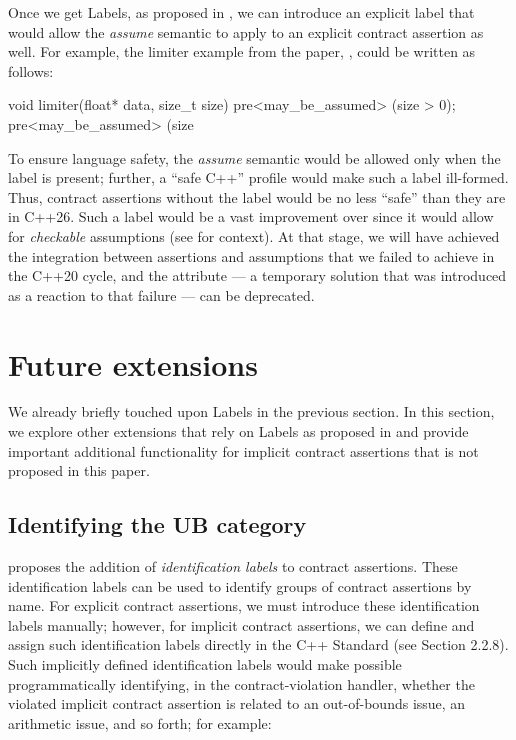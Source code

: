{Once we get Labels, as proposed in \cite{P3400R1}, we can introduce an explicit label that would allow the \emph{assume} semantic to apply to an explicit contract assertion as well. For example, the limiter example from the \tcode{[[assume]]} paper, \cite{P1774R8}, could be written as follows:
\begin{codeblock}
void limiter(float* data, size_t size)
  pre<may_be_assumed> (size > 0);
  pre<may_be_assumed> (size %
\end{codeblock}
To ensure language safety, the \emph{assume} semantic would be allowed only when the \mbox{} label is present; further, a ``safe C++'' profile would make such a label ill-formed. Thus, contract assertions without the label would be no less ``safe'' than they are in C++26. Such a label would be a vast improvement over \tcode{[[assume]]} since it would allow for \emph{checkable} assumptions (see \cite{P2064R0} for context). At that stage, we will have achieved the integration between assertions and assumptions that we failed to achieve in the C++20 cycle, and the \tcode{[[assume]]} attribute --- a temporary solution that was introduced as a reaction to that failure --- can be deprecated.

\section{Future extensions}
\label{ext}

We already briefly touched upon Labels in the previous section. In this section, we explore other exten\-sions that rely on Labels as proposed in \cite{P3400R1} and provide important additional functionality for implicit contract assertions that is not proposed in this paper.

\subsection{Identifying the UB category}
\label{idlabels}

\cite{P3400R1} proposes the addition of \emph{identification labels} to contract assertions. These identification labels can be used to identify groups of contract assertions by name. For explicit contract assertions, we must introduce these identification labels manually; however, for implicit contract assertions, we can define and assign such identification labels directly in the C++ Standard (see \cite{P3400R1} Section 2.2.8). Such implicitly defined identification labels would make possible programmatically identifying, in the contract-violation handler, whether the violated implicit contract assertion  is related to an out-of-bounds issue, an arithmetic issue, and so forth; for example:

}
